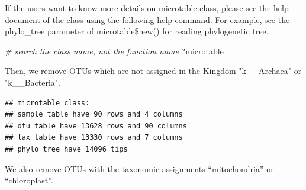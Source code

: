 \documentclass[
]{book}
\newenvironment{Shaded}{\begin{snugshade}}{\end{snugshade}}
\newcommand{\AttributeTok}[1]{\textcolor[rgb]{0.77,0.63,0.00}{#1}}
\newcommand{\CommentTok}[1]{\textcolor[rgb]{0.56,0.35,0.01}{\textit{#1}}}
\newcommand{\FunctionTok}[1]{\textcolor[rgb]{0.00,0.00,0.00}{#1}}
\newcommand{\NormalTok}[1]{#1}
\newcommand{\SpecialCharTok}[1]{\textcolor[rgb]{0.00,0.00,0.00}{#1}}
\newcommand{\StringTok}[1]{\textcolor[rgb]{0.31,0.60,0.02}{#1}}
\begin{document}
If the users want to know more details on microtable class,
please see the help document of the class using the following help command.
For example, see the phylo\_tree parameter of microtable\$new() for reading phylogenetic tree.

\begin{Shaded}
\begin{Highlighting}[]
\CommentTok{\# search the class name, not the function name}
\NormalTok{?microtable}
\end{Highlighting}
\end{Shaded}

Then, we remove OTUs which are not assigned in the Kingdom "k\_\_Archaea" or "k\_\_Bacteria".

\begin{Shaded}
\end{Shaded}

\begin{verbatim}
## microtable class:
## sample_table have 90 rows and 4 columns
## otu_table have 13628 rows and 90 columns
## tax_table have 13330 rows and 7 columns
## phylo_tree have 14096 tips
\end{verbatim}

We also remove OTUs with the taxonomic assignments ``mitochondria'' or ``chloroplast''.

\begin{Shaded}
\end{Shaded}
\end{document}
